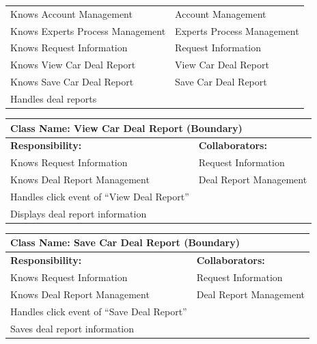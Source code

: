 \documentclass[]{article}
\begin{document}
\begin{itemize}
\begin{table}[H]
\begin{tabular}{|p{6cm}|p{6cm}|}
            \hline
            Knows Account Management & Account Management \\
            Knows Experts Process Management & Experts Process Management \\
            Knows Request Information & Request Information \\
            Knows View Car Deal Report & View Car Deal Report \\
            Knows Save Car Deal Report & Save Car Deal Report \\
            Handles deal reports & \\
            \hline
            \end{tabular}
        \end{table}
        \begin{table}[H]
            \centering
            \begin{tabular}{|p{6cm}|p{6cm}|}
            \hline 
             \multicolumn{2}{|l|}{\textbf{Class Name: View Car Deal Report (Boundary)}} \\
            \hline
            \textbf{Responsibility:} & \textbf{Collaborators:} \\
            \hline
            Knows Request Information & Request Information \\
            Knows Deal Report Management & Deal Report Management \\
            Handles click event of “View Deal Report” & \\
            Displays deal report information & \\
            \hline
            \end{tabular}
        \end{table}   
        \begin{table}[H]
            \centering
            \begin{tabular}{|p{6cm}|p{6cm}|}
            \hline 
             \multicolumn{2}{|l|}{\textbf{Class Name: Save Car Deal Report (Boundary)}} \\
            \hline
            \textbf{Responsibility:} & \textbf{Collaborators:} \\
            \hline
            Knows Request Information & Request Information \\
            Knows Deal Report Management & Deal Report Management \\
            Handles click event of “Save Deal Report” & \\
            Saves deal report information & \\

\end{tabular}
\end{table}
\end{itemize}
\end{document}
